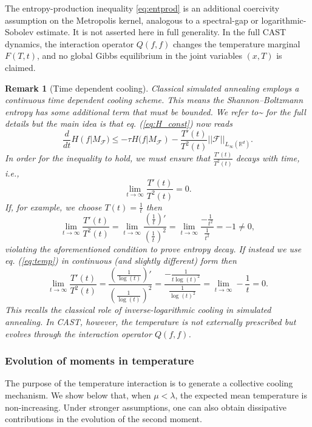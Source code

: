 \documentclass[10pt,a4paper]{article}
\theoremstyle{theorem}
\newtheorem{remark}{Remark}[section]
\numberwithin{equation}{section}
\begin{document}
The entropy-production inequality \eqref{eq:entprod} is an additional coercivity assumption on the Metropolis kernel, analogous to a spectral-gap or logarithmic-Sobolev estimate. It is not asserted here in full generality.
In the full CAST dynamics, the interaction operator \(Q(f,f)\) changes the
temperature marginal \(F(T,t)\), and no global Gibbs equilibrium in the joint
variables \((x,T)\) is claimed.
\begin{remark}[Time dependent cooling]
Classical simulated annealing employs a continuous time dependent cooling scheme. This means the Shannon--Boltzmann entropy has some additional term that must be bounded. We refer to^^>\cite{pareschi_optimization_2024} for the full details but the main idea is that eq. (\ref{eq:H_const}) now reads
\begin{equation*}
\frac{d}{dt}H(f|M_\mathcal{F}) \leq -\tau H(f|M_\mathcal{F})-\frac{T'(t)}{T^2(t)}||\mathcal{F}||_{L_\infty(\mathbb{R}^d)}.
\end{equation*}
In order for the inequality to hold, we must ensure that $\frac{T'(t)}{T^2(t)}$ decays with time, i.e., 
\begin{equation*}
\lim_{t\rightarrow\infty}\frac{T'(t)}{T^2(t)}=0.
\end{equation*} 
If, for example, we choose $T(t)=\frac{1}{t}$ then 
\begin{equation}
\lim_{t\rightarrow\infty}\frac{T'(t)}{T^2(t)}=\lim_{t\rightarrow\infty}\frac{\left(\frac{1}{t}\right)'}{\left(\frac{1}{t}\right)^2}=\lim_{t\rightarrow\infty}\frac{-\frac{1}{t^2}}{\frac{1}{t^2}}=-1\neq0,
\end{equation}
violating the aforementioned condition to prove entropy decay. If instead we use eq. (\ref{eq:temp}) in continuous (and slightly different) form then
\begin{equation}
\lim_{t\rightarrow\infty}\frac{T'(t)}{T^2(t)}=\frac{\left(\frac{1}{\log(t)}\right)'}{\left(\frac{1}{\log(t)}\right)^2}=\frac{-\frac{1}{t\log(t)^2}}{\frac{1}{\log(t)^2}}=\lim_{t\rightarrow\infty}-\frac{1}{t}=0.
\end{equation}
This recalls the classical role of inverse-logarithmic cooling in simulated
annealing. In CAST, however, the temperature is not externally prescribed but
evolves through the interaction operator \(Q(f,f)\).
\end{remark}


\subsubsection{Evolution of moments in temperature}
\label{subsec:analysis_moments}
The purpose of the temperature interaction is to generate a collective cooling
mechanism. We show below that, when \(\mu<\lambda\), the expected mean
temperature is non-increasing. Under stronger assumptions, one can also obtain
dissipative contributions in the evolution of the second moment. 
\end{document}

